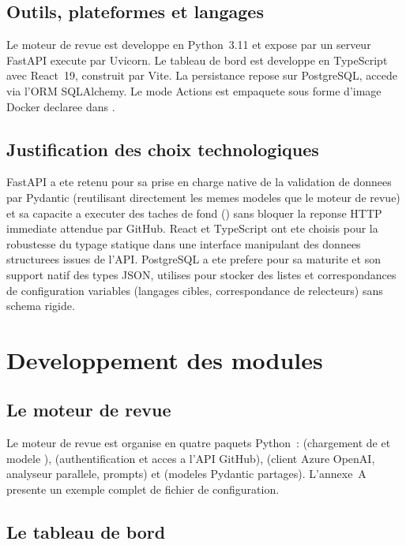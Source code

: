 \documentclass[a4paper,12pt,oneside]{report}
\begin{document}
\subsection{Outils, plateformes et langages}

Le moteur de revue est developpe en Python~3.11 et expose par un serveur FastAPI execute par Uvicorn. Le tableau de bord est developpe en TypeScript avec React~19, construit par Vite. La persistance repose sur PostgreSQL, accede via l'ORM SQLAlchemy. Le mode Actions est empaquete sous forme d'image Docker declaree dans .

\subsection{Justification des choix technologiques}

FastAPI a ete retenu pour sa prise en charge native de la validation de donnees par Pydantic (reutilisant directement les memes modeles que le moteur de revue) et sa capacite a executer des taches de fond () sans bloquer la reponse HTTP immediate attendue par GitHub. React et TypeScript ont ete choisis pour la robustesse du typage statique dans une interface manipulant des donnees structurees issues de l'API. PostgreSQL a ete prefere pour sa maturite et son support natif des types JSON, utilises pour stocker des listes et correspondances de configuration variables (langages cibles, correspondance de relecteurs) sans schema rigide.

\section{Developpement des modules}

\subsection{Le moteur de revue}

Le moteur de revue est organise en quatre paquets Python~:  (chargement de  et modele )\allowbreak,  (authentification et acces a l'API GitHub),  (client Azure OpenAI, analyseur parallele, prompts) et  (modeles Pydantic partages). L'annexe~A presente un exemple complet de fichier de configuration.

\subsection{Le tableau de bord}
\end{document}
